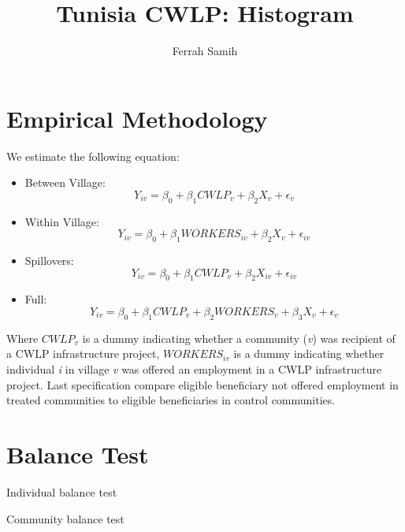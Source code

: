 \documentclass[10pt,a4paper]{article}
\begin{document}
\author{Ferrah Samih}\title{Tunisia CWLP: Histogram}\maketitle
\pagebreak
\listoffigures
\pagebreak

\section{Empirical Methodology}
We estimate the following equation:
\begin{itemize}
\item Between Village: \begin{equation} Y_{iv} = \beta_{0} + \beta_{1}CWLP_{v} + \beta_{2}X_{v} + \epsilon_{v} \end{equation}
\item Within Village: \begin{equation} Y_{iv} = \beta_{0} + \beta_{1}WORKERS_{iv} + \beta_{2}X_{v} + \epsilon_{iv} \end{equation}
\item Spillovers: \begin{equation} Y_{iv} = \beta_{0} + \beta_{1}CWLP_{v} + \beta_{2}X_{iv} + \epsilon_{iv} \end{equation}
\item Full: \begin{equation} Y_{iv} = \beta_{0} + \beta_{1}CWLP_{v} + \beta_{2}WORKERS_{v} + \beta_{3}X_{v} + \epsilon_{v} \end{equation}
\end{itemize}
Where $ CWLP_{v} $ is a dummy indicating whether a community (\textit{v}) was recipient of a CWLP infrastructure project, $ WORKERS_{iv} $ is a dummy indicating whether individual \textit{i} in village \textit{v} was offered an employment in a CWLP infrastructure project. Last specification compare eligible beneficiary not offered employment in treated communities to eligible beneficiaries in control communities.
\pagebreak
\section{Balance Test}
\begin{table}[H]\centering\caption{Individual balance test}
\resizebox{\textwidth}{!}{}
\end{table}
\begin{table}[H]\centering\caption{Community balance test}
\resizebox{\textwidth}{!}{}
\end{table}
\pagebreak
\end{document}
